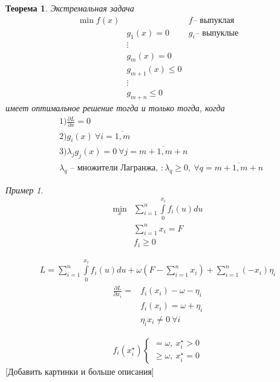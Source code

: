\documentclass[12pt,a4paper,titlepage,oneside]{book}
\theoremstyle{definition}
\theoremstyle{plain}
\newtheorem{theorem}{Теорема}[chapter]
\theoremstyle{remark}
\theoremstyle{remark}
\newtheorem{example}{Пример}
\theoremstyle{plain}
\theoremstyle{plain}
\begin{document}
\begin{theorem}
Экстремальная задача
\begin{align*}
\min f(x)& & f \text{-- выпуклая}\\
&g_1(x) = 0 & g_i   \text{-- выпуклые}\\
&\vdots\\
&g_m(x) = 0\\
&g_{m+1}(x) \leq 0\\
&\vdots\\
&g_{m+n} \leq 0
\end{align*}
имеет оптимальное решение тогда  и только тогда, когда
\begin{align*}
&1) \frac{\partial L}{\partial x} = 0\\
&2) g_i(x) \: \forall i = \overline{1,m}\\
&3) \lambda_{j} g_j(x) = 0 \: \forall j = \overline{m+1,m+n}\\
&\lambda_q \text{ -- множители Лагранжа, } :\lambda_q \geq 0, \: \forall q = \overline{m+1,m+n}
\end{align*}
\end{theorem}
\begin{example}
\begin{align*}
\min\limits_x &\sum\limits_{i=1}^n \int\limits_0^{x_i} f_i(u)du\\
&\sum\limits_{i=1}^n x_i = F \\
&f_i \geq 0
\end{align*}
\end{example}
\begin{align*}
L = \sum\limits_{i=1}^n \int \limits_0^{x_i} f_i(u)du + \omega(F - \sum\limits_{i=1}^n x_i) + \sum\limits_{i=1}^n (-x_i)\eta_i
\end{align*}
\begin{align*}
\frac{\partial L}{\partial x_i} = &f_i(x_i) - \omega -\eta_i\\
&f_i(x_i) = \omega + \eta_i \\
&\eta_i x_i \neq 0 \: \forall i
\end{align*}

\begin{align*}
f_i(x_i^\star)  \begin{cases} = \omega, \: x_i^\star > 0\\
\geq \omega, \: x_i^\star = 0
\end{cases}
\end{align*}
[Добавить картинки и больше описания]
\end{document}

